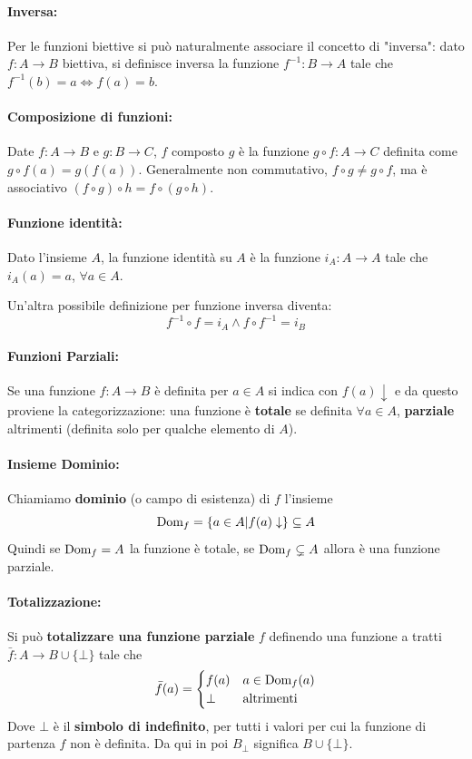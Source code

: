 \paragraph{Inversa:} Per le funzioni biettive si può naturalmente associare il concetto di "inversa": dato $f: A \rightarrow B$ biettiva, si definisce inversa la funzione $f^{-1}: B \rightarrow A$ tale che $f^{-1} (b) = a \Leftrightarrow f(a) = b$.

\paragraph{Composizione di funzioni:} Date $f: A \rightarrow B$ e $g: B \rightarrow C$, $f$ composto $g$ è la funzione $g \circ f: A \rightarrow C$ definita come $g \circ f(a) = g(f(a))$. Generalmente non commutativo, $f \circ g \neq g \circ f$, ma è associativo $(f \circ g) \circ h = f \circ (g \circ h)$.

\paragraph{Funzione identità:} Dato l'insieme $A$, la funzione identità su $A$ è la funzione $i_A: A \rightarrow A$ tale che $i_A (a) = a$, $\forall a \in A$.

Un'altra possibile definizione per funzione inversa diventa:
$$ f^{-1} \circ f = i_A \wedge f \circ f^{-1} = i_B $$

\paragraph{Funzioni Parziali:} Se una funzione $f: A \rightarrow B$ è definita per $a \in A$ si indica con $f(a) \downarrow$  e da questo proviene la categorizzazione: una funzione è \textbf{totale} se definita $\forall a \in A$, \textbf{parziale} altrimenti (definita solo per qualche elemento di $A$).

\paragraph{Insieme Dominio:} Chiamiamo \textbf{dominio} (o campo di esistenza) di $f$ l'insieme
$$ \text{Dom}_f = \left\{a \in A | f(a) \downarrow \right\} \subseteq A $$
Quindi se $\text{Dom}_f = A$ la funzione è totale, se $\text{Dom}_f \subsetneq A$ allora è una funzione parziale.

\paragraph{Totalizzazione:} Si può \textbf{totalizzare una funzione parziale} $f$ definendo una funzione a tratti $\bar{f}: A \rightarrow B \cup \{\bot\}$ tale che
$$ 
\bar{f} (a) = \begin{cases}
	f(a) & a \in \text{Dom}_f(a) \\
	\bot & \text{altrimenti}
\end{cases}
$$
Dove $\bot$ è il \textbf{simbolo di indefinito}, per tutti i valori per cui la funzione di partenza $f$ non è definita. Da qui in poi $B_\bot$ significa $B \cup \{\bot\}$.

